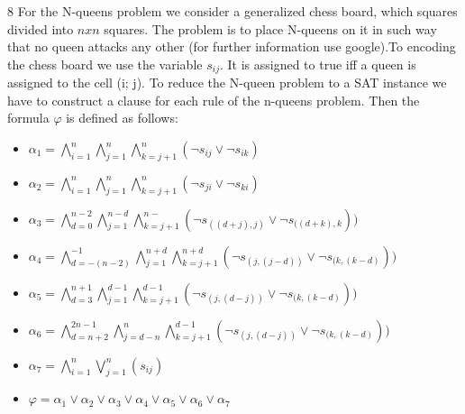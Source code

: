\documentclass [11pt]{article}
\renewcommand{\phi}{\varphi}
\newcommand{\solution}[1]{\noindent {\bf Solution.}  #1}
\begin{document}
\solution{ 8}
For the  N-queens problem we consider  a generalized chess board, which squares divided into $n x n$  squares. The problem is to place N-queens on it in such way that no queen attacks any other (for further information use google).To encoding the chess board we use the variable $s_{ij}$. It  is assigned to true iff a queen is assigned to the cell (i; j).  To reduce the N-queen problem to a SAT instance we have to construct a clause for each rule of the n-queens problem. Then the formula $ \phi$ is defined as follows:

 \begin{center}
 \begin{itemize}
\item $ \alpha_1 = \bigwedge _{i=1} ^{n}   \bigwedge _{j=1} ^{n}   \bigwedge _{k=j+1} ^{n} (\neg s_{ij} \vee \neg s_{ik} ) $
\item $ \alpha_2 = \bigwedge _{i=1} ^{n}   \bigwedge _{j=1} ^{n}   \bigwedge _{k=j+1} ^{n} (\neg s_{ji} \vee \neg s_{ki} ) $
\item $ \alpha_3 = \bigwedge _{d=0} ^{n-2}   \bigwedge _{j=1} ^{n-d}   \bigwedge _{k=j+1} ^{n-} (\neg s_{((d+j),j)} \vee \neg s_{((d+k),k} )) $
\item $ \alpha_4 = \bigwedge _{d=-(n-2)} ^{-1}   \bigwedge _{j=1} ^{n+d}   \bigwedge _{k=j+1} ^{n+d} (\neg s_{(j,(j-d))} \vee \neg s_{(k,(k-d)} )) $
\item $ \alpha_5 = \bigwedge _{d=3} ^{n+1}   \bigwedge _{j=1} ^{d-1}   \bigwedge _{k=j+1} ^{d-1} (\neg s_{(j,(d-j))} \vee \neg s_{(k,(k-d)} )) $
\item $ \alpha_6 = \bigwedge _{d=n+2} ^{2n-1}   \bigwedge _{j=d-n} ^{n}   \bigwedge _{k=j+1} ^{d-1} (\neg s_{(j,(d-j))} \vee \neg s_{(k,(k-d)} )) $
\item $ \alpha_7 = \bigwedge _{i=1} ^{n}   \bigvee _{j=1} ^{n} (s_{ij}) $

  \bigskip
\item $\phi =  \alpha_1 \vee \alpha_2 \vee \alpha_3 \vee \alpha_4 \vee \alpha_5 \vee \alpha_6 \vee \alpha_7$ 

 \end{itemize}
\end{center}
\end{document}
